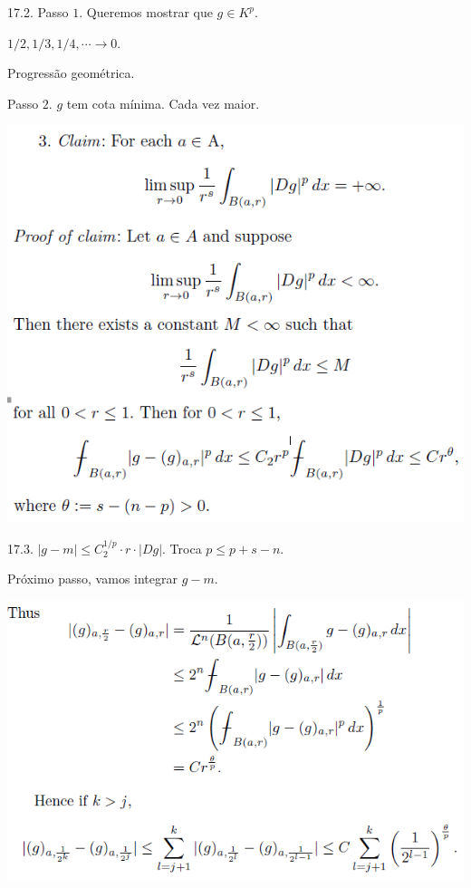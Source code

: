 \documentclass[12pt]{article}
\begin{document}
17.2. Passo $1$. Queremos mostrar que $g \in K^p$.

$1/2, 1/3, 1/4, \cdots \to 0$.

Progress\~ao geom\'etrica.

Passo $2$. $g$ tem cota m\'inima. Cada vez maior.

\vspace{300mm}

		\begin{center}
		\includegraphics{22}
		\end{center}

17.3. $|g - m| \le C_2^{1/p}\cdot r \cdot |Dg|$. Troca $p \le p + s - n$.

Pr\'oximo passo, vamos integrar $g - m$.

\vspace{300mm}

		\begin{center}
		\includegraphics{23}
		\end{center}
\end{document}
